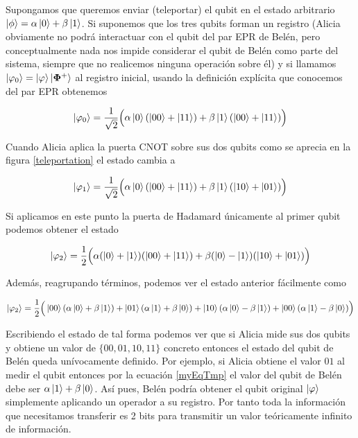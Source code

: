 \documentclass[11pt, spanish]{report}
\numberwithin{equation}{section}
\numberwithin{defin}{section}
\begin{document}
\begin{appendices}
Supongamos que queremos enviar (teleportar) el qubit en el estado arbitrario $\ket{\phi}=\alpha\ket{0}+\beta\ket{1}$. Si suponemos que los tres qubits forman un registro (Alicia obviamente no podrá interactuar con el qubit del par EPR de Belén, pero conceptualmente nada nos impide considerar el qubit de Belén como parte del sistema, siempre que no realicemos ninguna operación sobre él) y si llamamos $\ket{\varphi_0}=\ket{\varphi}\ket{\mathbf{\Phi}^+}$ al registro inicial, usando la definición explícita que conocemos del par EPR obtenemos

\begin{equation}
\ket{\varphi_0}=\frac{1}{\sqrt{2}}\Big(\alpha\ket{0}(\ket{00}+\ket{11})+\beta\ket{1}(\ket{00}+\ket{11})\Big)
\end{equation} 

Cuando Alicia aplica la puerta CNOT sobre sus dos qubits como se aprecia en la figura \ref{teleportation} el estado cambia a 

\begin{equation}
\ket{\varphi_1}=\frac{1}{\sqrt{2}}\Big(\alpha\ket{0}(\ket{00}+\ket{11})+\beta\ket{1}(\ket{10}+\ket{01})\Big)
\end{equation} 

Si aplicamos en este punto la puerta de Hadamard únicamente al primer qubit podemos obtener el estado 

\begin{equation}
\ket{\varphi_2}=\frac{1}{2}\Big(\alpha(\ket{0}+\ket{1})(\ket{00}+\ket{11})+\beta(\ket{0}-\ket{1})(\ket{10}+\ket{01})\Big)
\end{equation}

Además, reagrupando términos, podemos ver el estado anterior fácilmente como 


\begin{equation}\label{myEqTmp}
\ket{\varphi_2}=\frac{1}{2}\Big(\ket{00}(\alpha\ket{0}+\beta\ket{1})+\ket{01}(\alpha\ket{1}+\beta\ket{0})+\ket{10}(\alpha\ket{0}-\beta\ket{1})+\ket{00}(\alpha\ket{1}-\beta\ket{0}) \Big)
\end{equation}

Escribiendo el estado de tal forma podemos ver que si Alicia mide sus dos qubits y obtiene un valor de $\{00,01,10,11\}$ concreto entonces el estado del qubit de Belén queda unívocamente definido. Por ejemplo, si Alicia obtiene el valor $01$ al medir el qubit entonces por la ecuación \ref{myEqTmp} el valor del qubit de Belén debe ser $\alpha\ket{1}+\beta\ket{0}$. Así pues, Belén podría obtener el qubit original $\ket{\varphi}$ simplemente aplicando un operador a su registro. Por tanto toda la información que necesitamos transferir es 2 bits para transmitir un valor teóricamente infinito de información.\footnotemark{}\\


\end{appendices}
\end{document}

